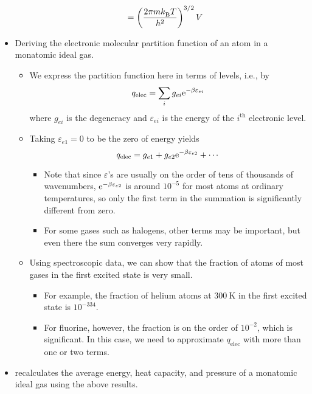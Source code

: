 \documentclass[../notes.tex]{subfiles}
\begin{document}
\begin{itemize}
\begin{itemize}
\begin{align*}
            &= \left( \frac{2\pi m\kB T}{h^2} \right)^{3/2}V
        \end{align*}
    \end{itemize}
    \item {}Deriving the electronic molecular partition function of an atom in a monatomic ideal gas.
    \begin{itemize}
        \item We express the partition function here in terms of levels, i.e., by
        \begin{equation*}
            q_\text{elec} = \sum_ig_{ei}\e[-\beta\varepsilon_{ei}]
        \end{equation*}
        where $g_{ei}$ is the degeneracy and $\varepsilon_{ei}$ is the energy of the $i^\text{th}$ electronic level.
        \item Taking $\varepsilon_{e1}=0$ to be the zero of energy yields
        \begin{equation*}
            q_\text{elec} = g_{e1}+g_{e2}\e[-\beta\varepsilon_{e2}]+\cdots
        \end{equation*}
        \begin{itemize}
            \item Note that since $\varepsilon$'s are usually on the order of tens of thousands of wavenumbers, $\e[-\beta\varepsilon_{e2}]$ is around $10^{-5}$ for most atoms at ordinary temperatures, so only the first term in the summation is significantly different from zero.
            \item For some gases such as halogens, other terms may be important, but even there the sum converges very rapidly.
        \end{itemize}
        \item Using spectroscopic data, we can show that the fraction of atoms of most gases in the first excited state is very small.
        \begin{itemize}
            \item For example, the fraction of helium atoms at $\SI{300}{\kelvin}$ in the first excited state is $10^{-334}$.
            \item For fluorine, however, the fraction is on the order of $10^{-2}$, which is significant. In this case, we need to approximate $q_\text{elec}$ with more than one or two terms.
        \end{itemize}
    \end{itemize}
    \item \textcite{bib:McQuarrieSimon} recalculates the average energy, heat capacity, and pressure of a monatomic ideal gas using the above results.

\end{itemize}
\end{document}
